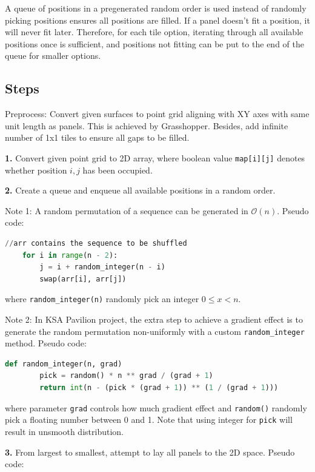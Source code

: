 \documentclass{article}
\begin{document}
A queue of positions in a pregenerated random order is used instead of randomly picking positions ensures all positions are filled. If a panel doesn't fit a position, it will never fit later. Therefore, for each tile option, iterating through all available positions once is sufficient, and positions not fitting can be put to the end of the queue for smaller options.

\subsection{Steps}

Preprocess: Convert given surfaces to point grid aligning with XY axes with same unit length as panels. This is achieved by Grasshopper. Besides, add infinite number of 1x1 tiles to ensure all gaps to be filled.

\textbf{1.} Convert given point grid to 2D array, where boolean value \lstinline{map[i][j]} denotes whether position $i,j$ has been occupied.

\textbf{2.} Create a queue and enqueue all available positions in a random order.

Note 1: A random permutation of a sequence can be generated in $\mathcal{O}(n)$. Pseudo code:

\begin{lstlisting}[language=Python]
	//arr contains the sequence to be shuffled
	for i in range(n - 2):
		j = i + random_integer(n - i)
		swap(arr[i], arr[j])
\end{lstlisting}

where \lstinline{random_integer(n)} randomly pick an integer $0 \leq x < n$.

Note 2: In KSA Pavilion project, the extra step to achieve a gradient effect is to generate the random permutation non-uniformly with a custom \lstinline{random_integer} method. Pseudo code:

\begin{lstlisting}[language=Python]
	def random_integer(n, grad)
		pick = random() * n ** grad / (grad + 1)
		return int(n - (pick * (grad + 1)) ** (1 / (grad + 1)))
\end{lstlisting}

where parameter \lstinline{grad} controls how much gradient effect and \lstinline{random()} randomly pick a floating number between 0 and 1. Note that using integer for \lstinline{pick} will result in unsmooth distribution.

\textbf{3.} From largest to smallest, attempt to lay all panels to the 2D space. Pseudo code:
\end{document}
